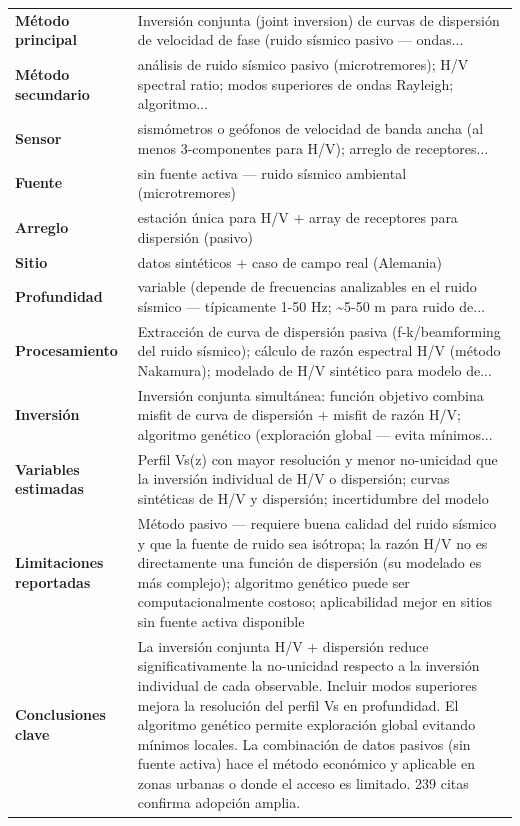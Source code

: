\begin{center}\scriptsize
\begin{tabularx}{\textwidth}{@{}>{\bfseries}p{3.3cm} X@{}}
\toprule
M\'etodo principal & Inversión conjunta (joint inversion) de curvas de dispersión de velocidad de fase (ruido sísmico pasivo --- ondas... \\
M\'etodo secundario & análisis de ruido sísmico pasivo (microtremores); H/V spectral ratio; modos superiores de ondas Rayleigh; algoritmo... \\
Sensor & sismómetros o geófonos de velocidad de banda ancha (al menos 3-componentes para H/V); arreglo de receptores... \\
Fuente & sin fuente activa --- ruido sísmico ambiental (microtremores) \\
Arreglo & estación única para H/V + array de receptores para dispersión (pasivo) \\
Sitio & datos sintéticos + caso de campo real (Alemania) \\
Profundidad & variable (depende de frecuencias analizables en el ruido sísmico --- típicamente 1-50 Hz; \textasciitilde{}5-50 m para ruido de... \\
Procesamiento & Extracción de curva de dispersión pasiva (f-k/beamforming del ruido sísmico); cálculo de razón espectral H/V (método Nakamura); modelado de H/V sintético para modelo de... \\
Inversi\'on & Inversión conjunta simultánea: función objetivo combina misfit de curva de dispersión + misfit de razón H/V; algoritmo genético (exploración global --- evita mínimos... \\
Variables estimadas & Perfil Vs(z) con mayor resolución y menor no-unicidad que la inversión individual de H/V o dispersión; curvas sintéticas de H/V y dispersión; incertidumbre del modelo \\
Limitaciones reportadas & Método pasivo --- requiere buena calidad del ruido sísmico y que la fuente de ruido sea isótropa; la razón H/V no es directamente una función de dispersión (su modelado es más complejo); algoritmo genético puede ser computacionalmente costoso; aplicabilidad mejor en sitios sin fuente activa disponible \\
Conclusiones clave & La inversión conjunta H/V + dispersión reduce significativamente la no-unicidad respecto a la inversión individual de cada observable. Incluir modos superiores mejora la resolución del perfil Vs en profundidad. El algoritmo genético permite exploración global evitando mínimos locales. La combinación de datos pasivos (sin fuente activa) hace el método económico y aplicable en zonas urbanas o donde el acceso es limitado. 239 citas confirma adopción amplia. \\

\end{tabularx}
\end{center}
